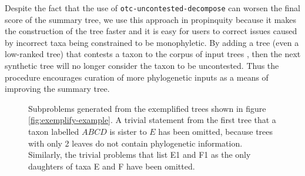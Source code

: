 \documentclass[fleqn,12pt,lineno,english]{wlpeerj}
\newcommand{\lyxdot}{.}
\begin{document}
Despite the fact that the use of \texttt{otc-uncontested-decompose}
can worsen the final score of the summary tree, we use this approach
in propinquity because it makes the construction of the tree faster
and it is easy for users to correct issues caused by incorrect taxa
being constrained to be monophyletic. By adding a tree (even a low-ranked
tree) that contests a taxon to the corpus of input trees , then the
next synthetic tree will no longer consider the taxon to be uncontested.
Thus the procedure encourages curation of more phylogenetic inputs
as a means of improving the summary tree. 

\begin{figure}


\caption{Subproblems generated from the exemplified trees shown in figure \ref{fig:exemplify-example}.
A trivial statement from the first tree that a taxon labelled $ABCD$
is sister to $E$ has been omitted, because trees with only 2 leaves
do not contain phylogenetic information.
Similarly, the trivial problems that list E1 and F1 as the only daughters
of taxa E and F have been omitted.}
\label{fig:subproblems-example}
\end{figure}
\end{document}
